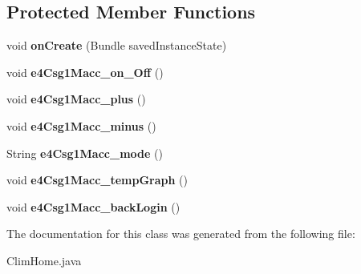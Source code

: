 \subsection*{Protected Member Functions}
\begin{DoxyCompactItemize}
\item 
\mbox{\label{classcom_1_1example_1_1j__lds_1_1macc_1_1_clim_home_a5291ba568133ddc3781d5a5c00423103}} 
void {\bfseries on\+Create} (Bundle saved\+Instance\+State)
\item 
\mbox{\label{classcom_1_1example_1_1j__lds_1_1macc_1_1_clim_home_a791abf995e0bfbe042b5d232bfa325b4}} 
void {\bfseries e4\+Csg1\+Macc\+\_\+on\+\_\+\+Off} ()
\item 
\mbox{\label{classcom_1_1example_1_1j__lds_1_1macc_1_1_clim_home_ac4fe647dbee99df38770804e858146dc}} 
void {\bfseries e4\+Csg1\+Macc\+\_\+plus} ()
\item 
\mbox{\label{classcom_1_1example_1_1j__lds_1_1macc_1_1_clim_home_add576228d3eea662639b16bf2af54c93}} 
void {\bfseries e4\+Csg1\+Macc\+\_\+minus} ()
\item 
\mbox{\label{classcom_1_1example_1_1j__lds_1_1macc_1_1_clim_home_a85d446f4cf76006b86fadeeeabb43687}} 
String {\bfseries e4\+Csg1\+Macc\+\_\+mode} ()
\item 
\mbox{\label{classcom_1_1example_1_1j__lds_1_1macc_1_1_clim_home_a537420aa4584bf16fc192ecdb07b0769}} 
void {\bfseries e4\+Csg1\+Macc\+\_\+temp\+Graph} ()
\item 
\mbox{\label{classcom_1_1example_1_1j__lds_1_1macc_1_1_clim_home_aa3393761ce82cd4ffcd83ba3d17690aa}} 
void {\bfseries e4\+Csg1\+Macc\+\_\+back\+Login} ()
\end{DoxyCompactItemize}


The documentation for this class was generated from the following file\+:\begin{DoxyCompactItemize}
\item 
Clim\+Home.\+java\end{DoxyCompactItemize}

